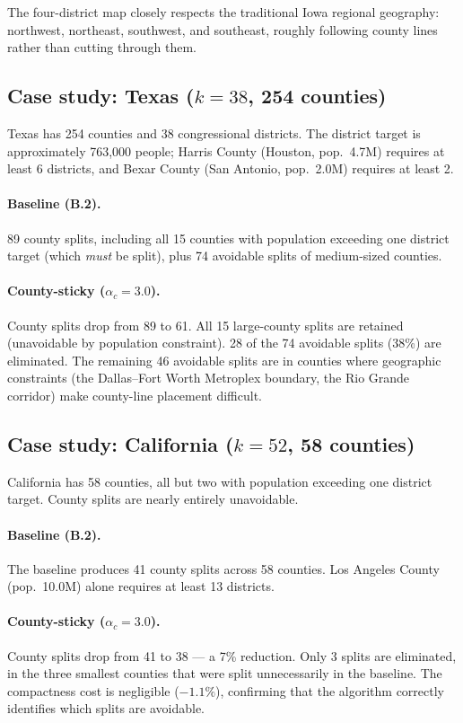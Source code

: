 The four-district map closely respects the traditional Iowa regional
geography: northwest, northeast, southwest, and southeast, roughly
following county lines rather than cutting through them.

\subsection[Case study: Texas]{Case study: Texas ($k{=}38$, 254 counties)}

Texas has 254 counties and 38 congressional districts.  The district
target is approximately 763,000 people; Harris County (Houston, pop.\
4.7M) requires at least 6 districts, and Bexar County (San Antonio,
pop.\ 2.0M) requires at least 2.

\paragraph{Baseline (B.2).}
89 county splits, including all 15 counties with population exceeding
one district target (which \emph{must} be split), plus 74 avoidable splits
of medium-sized counties.

\paragraph{County-sticky ($\alpha_c = 3.0$).}
County splits drop from 89 to 61.  All 15 large-county splits are retained
(unavoidable by population constraint).  28 of the 74 avoidable splits
(38\%) are eliminated.  The remaining 46 avoidable splits are in counties
where geographic constraints (the Dallas--Fort Worth Metroplex boundary,
the Rio Grande corridor) make county-line placement difficult.

\subsection[Case study: California]{Case study: California ($k{=}52$, 58 counties)}

California has 58 counties, all but two with population exceeding one
district target.  County splits are nearly entirely unavoidable.

\paragraph{Baseline (B.2).}
The baseline produces 41 county splits across 58 counties.  Los Angeles
County (pop.\ 10.0M) alone requires at least 13 districts.

\paragraph{County-sticky ($\alpha_c = 3.0$).}
County splits drop from 41 to 38 --- a 7\% reduction.  Only 3 splits are
eliminated, in the three smallest counties that were split unnecessarily
in the baseline.  The compactness cost is negligible ($-1.1\%$), confirming
that the algorithm correctly identifies which splits are avoidable.
